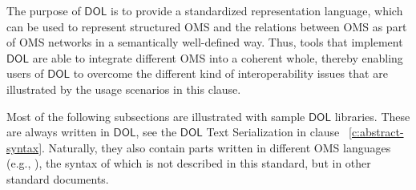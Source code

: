 \documentclass[10pt, a4paper]{isov2}
\newcommand*{\DOL}{\ensuremath{\mathsf{DOL}}\xspace}
\begin{document}
The purpose of \DOL is to provide  a
standardized representation language, which can be used to represent structured OMS and the relations
between OMS as part of OMS networks in a semantically well-defined way. Thus, tools that implement \DOL are able to integrate different OMS into a coherent whole, thereby enabling users of \DOL to overcome the different kind of interoperability issues that are illustrated by the usage scenarios in this clause.


Most of the following subsections are illustrated with sample \DOL
libraries. These are always written in \DOL, see the \DOL Text
Serialization in clause ~\ref{c:abstract-syntax}. Naturally, they also
contain parts written in different OMS languages (e.g., \OWL), the
syntax of which is not described in this standard, but in other
standard documents.
\end{document}
